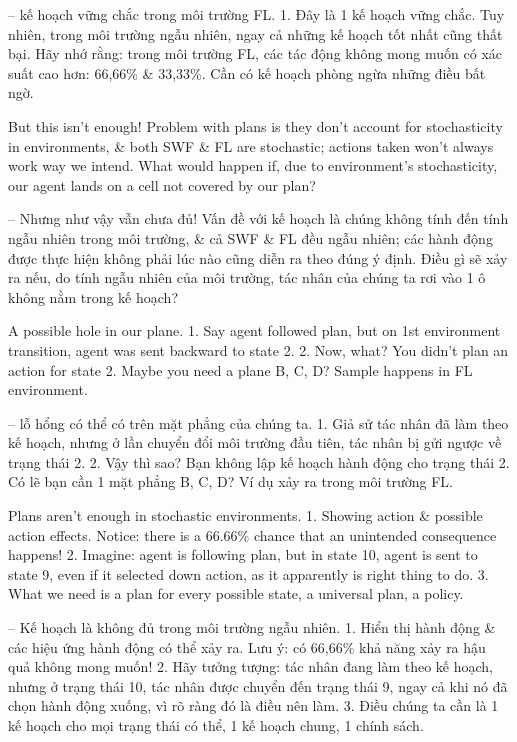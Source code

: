 \documentclass{article}
\begin{document}
\begin{itemize}
\begin{itemize}
        -- { kế hoạch vững chắc trong môi trường FL.} 1. Đây là 1 kế hoạch vững chắc. Tuy nhiên, trong môi trường ngẫu nhiên, ngay cả những kế hoạch tốt nhất cũng thất bại. Hãy nhớ rằng: trong môi trường FL, các tác động không mong muốn có xác suất cao hơn: 66,66\% \& 33,33\%. Cần có kế hoạch phòng ngừa những điều bất ngờ.

        But this isn’t enough! Problem with plans is they don't account for stochasticity in environments, \& both SWF \& FL are stochastic; actions taken won't always work way we intend. What would happen if, due to environment's stochasticity, our agent lands on a cell not covered by our plan?

        -- Nhưng như vậy vẫn chưa đủ! Vấn đề với kế hoạch là chúng không tính đến tính ngẫu nhiên trong môi trường, \& cả SWF \& FL đều ngẫu nhiên; các hành động được thực hiện không phải lúc nào cũng diễn ra theo đúng ý định. Điều gì sẽ xảy ra nếu, do tính ngẫu nhiên của môi trường, tác nhân của chúng ta rơi vào 1 ô không nằm trong kế hoạch?

        {\sf A possible hole in our plane.} 1. Say agent followed plan, but on 1st environment transition, agent was sent backward to state 2. 2. Now, what? You didn't plan an action for state 2. Maybe you need a plane B, C, D? Sample happens in FL environment.

        -- { lỗ hổng có thể có trên mặt phẳng của chúng ta.} 1. Giả sử tác nhân đã làm theo kế hoạch, nhưng ở lần chuyển đổi môi trường đầu tiên, tác nhân bị gửi ngược về trạng thái 2. 2. Vậy thì sao? Bạn không lập kế hoạch hành động cho trạng thái 2. Có lẽ bạn cần 1 mặt phẳng B, C, D? Ví dụ xảy ra trong môi trường FL.

        {\sf Plans aren't enough in stochastic environments.} 1. Showing action \& possible action effects. Notice: there is a 66.66\% chance that an unintended consequence happens! 2. Imagine: agent is following plan, but in state 10, agent is sent to state 9, even if it selected down action, as it apparently is right thing to do. 3. What we need is a plan for every possible state, a universal plan, a policy.

        -- {\sf Kế hoạch là không đủ trong môi trường ngẫu nhiên.} 1. Hiển thị hành động \& các hiệu ứng hành động có thể xảy ra. Lưu ý: có 66,66\% khả năng xảy ra hậu quả không mong muốn! 2. Hãy tưởng tượng: tác nhân đang làm theo kế hoạch, nhưng ở trạng thái 10, tác nhân được chuyển đến trạng thái 9, ngay cả khi nó đã chọn hành động xuống, vì rõ ràng đó là điều nên làm. 3. Điều chúng ta cần là 1 kế hoạch cho mọi trạng thái có thể, 1 kế hoạch chung, 1 chính sách.


\end{itemize}
\end{itemize}
\end{document}
